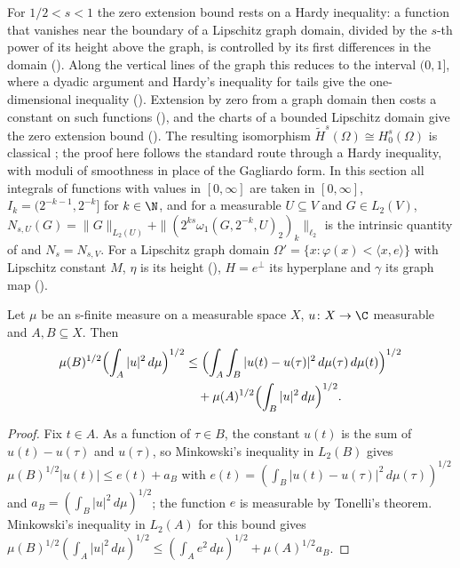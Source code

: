 For $1/2 < s < 1$ the zero extension bound rests on a Hardy inequality: a function that vanishes
near the boundary of a Lipschitz graph domain, divided by the $s$-th power of its height above
the graph, is controlled by its first differences in the domain (). Along
the vertical lines of the graph this reduces to the interval $(0, 1]$, where a dyadic argument
and Hardy's inequality for tails give the one-dimensional inequality ().
Extension by zero from a graph domain then costs a constant on such functions
(), and the charts of a bounded Lipschitz domain give the zero
extension bound (). The resulting isomorphism
$\tilde H^s(\Omega) \cong H^s_0(\Omega)$ is classical \cite[Theorem 3.33]{McLean}; the proof here
follows the standard route through a Hardy inequality, with moduli of smoothness in place of the
Gagliardo form. In this section all integrals of functions with values in $[0, \infty]$ are
taken in $[0, \infty]$, $I_k = (2^{-k-1}, 2^{-k}]$ for $k \in \N$, and for a measurable
$U \subseteq V$ and $G \in L_2(V)$,
$N_{s,U}(G) = \|G\|_{L_2(U)} + \|(2^{ks} \omega_1(G, 2^{-k}, U)_2)_k\|_{\ell_2}$ is the
intrinsic quantity of  and $N_s = N_{s,V}$. For a Lipschitz graph
domain $\Omega' = \{x : \varphi(x) < \langle x, e \rangle\}$ with Lipschitz constant $M$, $\eta$
is its height (), $H = e^\perp$ its hyperplane and $\gamma$ its graph map
().

\begin{lemma}
\label{lem:two-set-l2-comparison}
\leanok
Let $\mu$ be an s-finite measure on a measurable space $X$, $u \colon X \to \C$ measurable and
$A, B \subseteq X$. Then
\begin{align*}
  \mu(B)^{1/2} \Bigl(\int_A |u|^2 \, d\mu\Bigr)^{1/2}
  &\leq \Bigl(\int_A \int_B |u(t) - u(\tau)|^2 \, d\mu(\tau) \, d\mu(t)\Bigr)^{1/2} \\
  &\quad + \mu(A)^{1/2} \Bigl(\int_B |u|^2 \, d\mu\Bigr)^{1/2} .
\end{align*}
\end{lemma}

\begin{proof}
\leanok
Fix $t \in A$. As a function of $\tau \in B$, the constant $u(t)$ is the sum of
$u(t) - u(\tau)$ and $u(\tau)$, so Minkowski's inequality in $L_2(B)$ gives
$\mu(B)^{1/2} |u(t)| \leq e(t) + a_B$ with $e(t) = (\int_B |u(t) - u(\tau)|^2 \, d\mu(\tau))^{1/2}$
and $a_B = (\int_B |u|^2 \, d\mu)^{1/2}$; the function $e$ is measurable by Tonelli's theorem.
Minkowski's inequality in $L_2(A)$ for this bound gives
$\mu(B)^{1/2} (\int_A |u|^2 \, d\mu)^{1/2} \leq (\int_A e^2 \, d\mu)^{1/2} + \mu(A)^{1/2} a_B$.
\end{proof}

